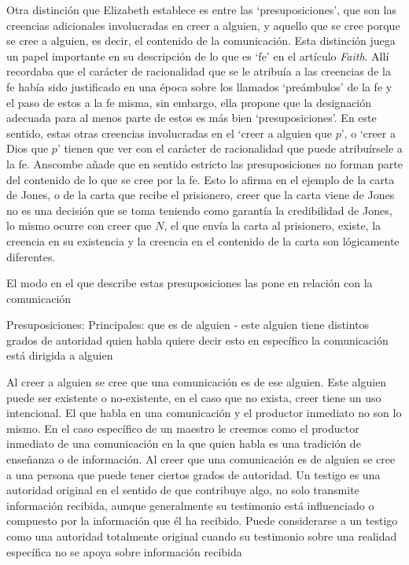 Otra distinción que Elizabeth establece es entre las `presuposiciones', que son las creencias adicionales involucradas en creer a alguien, y aquello que se cree porque se cree a alguien, es decir, el contenido de la comunicación. Esta distinción juega un papel importante en su descripción de lo que es `fe' en el artículo \emph{Faith}. Allí recordaba que el carácter de racionalidad que se le atribuía a las creencias de la fe había sido justificado en una época sobre los llamados `preámbulos' de la fe y el paso de estos a la fe misma, sin embargo, ella propone que la designación adecuada para al menos parte de estos es más bien `presuposiciones'. En este sentido, estas otras creencias involucradas en el `creer a alguien que $p$', o `creer a Dios que $p$' tienen que ver con el carácter de racionalidad que puede atribuírsele a la fe. Anscombe añade que en sentido estricto las presuposiciones no forman parte del contenido de lo que se cree por la fe. Esto lo afirma en el ejemplo de la carta de Jones, o de la carta que recibe el prisionero, creer que la carta viene de Jones no es una decisión que se toma teniendo como garantía la credibilidad de Jones, lo mismo ocurre con creer que $N$, el que envía la carta al prisionero, existe, la creencia en su existencia y la creencia en el contenido de la carta son lógicamente diferentes.

El modo en el que describe estas presuposiciones las pone en relación con la comunicación


Presuposiciones:
Principales:
que es de alguien
- este alguien tiene distintos grados de autoridad
quien habla quiere decir esto en específico
la comunicación está dirigida a alguien


Al creer a alguien se cree que una comunicación es de ese alguien. Este alguien puede ser existente o no-existente, en el caso que no exista, creer tiene un uso intencional.
El que habla en una comunicación y el productor inmediato no son lo mismo.
En el caso específico de un maestro le creemos como el productor inmediato de una comunicación en la que quien habla es una tradición de enseñanza o de información.
Al creer que una comunicación es de alguien se cree a una persona que puede tener ciertos grados de autoridad.
Un testigo es una autoridad original en el sentido de que contribuye algo, no solo transmite información recibida, aunque generalmente su testimonio está influenciado o compuesto por la información que él ha recibido.
Puede considerarse a un testigo como una autoridad totalmente original cuando su testimonio sobre una realidad específica no se apoya sobre información recibida

